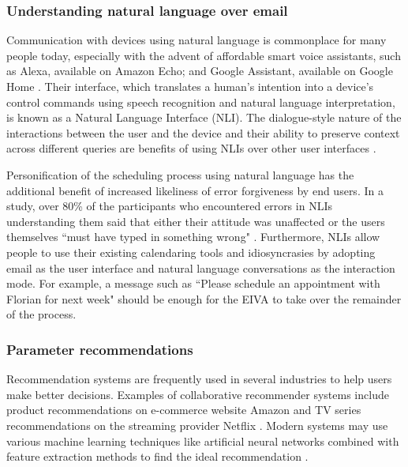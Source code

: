 \documentclass{article}
\begin{document}
\subsubsection{Understanding natural language over email}

Communication with devices using natural language is commonplace for many people today, especially with the advent of affordable smart voice assistants, such as Alexa, available on Amazon Echo; and Google Assistant, available on Google Home \cite{de_barcelos_silva_intelligent_2020}. Their interface, which translates a human's intention into a device's control commands using speech recognition and natural language interpretation, is known as a Natural Language Interface (NLI). The dialogue-style nature of the interactions between the user and the device and their ability to preserve context across different queries are benefits of using NLIs over other user interfaces \cite{kiseleva_predicting_2016}.

Personification of the scheduling process using natural language has the additional benefit of increased likeliness of error forgiveness by end users. In a study, over 80\% of the participants who encountered errors in NLIs understanding them said that either their attitude was unaffected or the users themselves ``must have typed in something wrong" \cite{kelley_iterative_1984}. Furthermore, NLIs allow people to use their existing calendaring tools and idiosyncrasies by adopting email as the user interface and natural language conversations as the interaction mode. For example, a message such as ``Please schedule an appointment with Florian for next week" should be enough for the EIVA to take over the remainder of the process.

\subsubsection{Parameter recommendations}

Recommendation systems are frequently used in several industries to help users make better decisions. Examples of collaborative recommender systems include product recommendations on e-commerce website Amazon \cite{linden_amazoncom_2003} and TV series recommendations on the streaming provider Netflix \cite{gomez-uribe_netflix_2016}. Modern systems may use various machine learning techniques like artificial neural networks combined with feature extraction methods to find the ideal recommendation \cite{adomavicius_toward_2005}.
\end{document}
